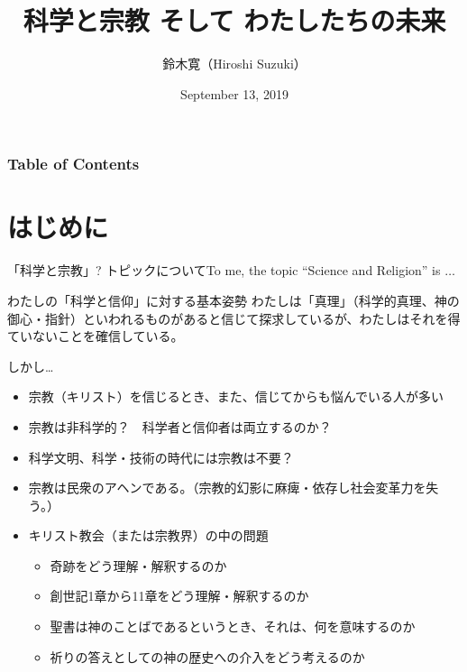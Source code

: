 \documentclass[10pt, dvipdfmx]{beamer}
\title[Science and Religion]{科学と宗教 そして わたしたちの未来 }
\author[H. Suzuki]{鈴木寛（Hiroshi Suzuki）}            %
\institute[ICU]{国際基督教大学（International Christian University）}  %
\date[2019/9/13]{September 13, 2019}
\begin{document}
\begin{frame}
\titlepage                    %
\end{frame}
\begin{frame}                  %
\frametitle{Table of Contents}%
\tableofcontents

\vfill
\end{frame}

\section{はじめに}
\begin{frame}{「科学と宗教」? トピックについて}{To me, the topic ``Science and Religion'' is $\ldots$}

\begin{alertblock}{わたしの「科学と信仰」に対する基本姿勢}
わたしは「真理」（科学的真理、神の御心・指針）といわれるものがあると信じて探求しているが、わたしはそれを得ていないことを確信している。
\end{alertblock}

\begin{exampleblock}{しかし\ldots}
\begin{itemize}
\item 宗教（キリスト）を信じるとき、また、信じてからも悩んでいる人が多い
\item 宗教は非科学的？　科学者と信仰者は両立するのか？　
\item 科学文明、科学・技術の時代には宗教は不要？　
\item 宗教は民衆のアヘンである。（宗教的幻影に麻痺・依存し社会変革力を失う。）
\item キリスト教会（または宗教界）の中の問題
\begin{itemize}
\item 奇跡をどう理解・解釈するのか
\item 創世記1章から11章をどう理解・解釈するのか
\item 聖書は神のことばであるというとき、それは、何を意味するのか
\item 祈りの答えとしての神の歴史への介入をどう考えるのか
\end{itemize}
\end{itemize}
\end{exampleblock}
\end{frame}
\end{document}
